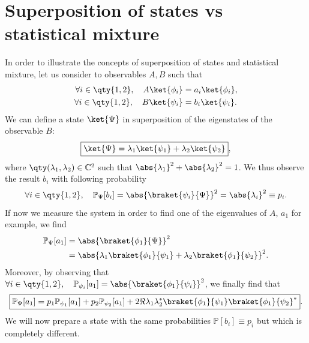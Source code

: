 \appendix
\setlength{\parskip}{2mm}\setlength{\parindent}{6mm}
\renewcommand{\thesubsection}{\thesection.\alph{subsection}\char41}
\renewcommand{\theequation}{\thechapter.~\arabic{equation}}
\chapter{Superposition of states vs statistical mixture}\label{ann:statmix}
In order to illustrate the concepts of superposition of states and statistical mixture, let us consider to observables $A,B$ such that
\begin{align*}
    \forall i\in\qty{1,2},\quad A\ket{\phi_i}&=a_i\ket{\phi_i},\\
    \forall i\in\qty{1,2},\quad B\ket{\psi_i}&=b_i\ket{\psi_i}.
\end{align*}
We can define a state $\ket{\Psi}$ in superposition of the eigenstates of the observable $B$:
\begin{equation}
    \boxed{\ket{\Psi} = \lambda_1\ket{\psi_1}+\lambda_2\ket{\psi_2}},
\end{equation}
where $\qty(\lambda_1,\lambda_2)\in\mathbb{C}^2$ such that $\abs{\lambda_1}^2+\abs{\lambda_2}^2=1$. We thus observe the result $b_i$ with following probability
\begin{equation}
    \forall i\in\qty{1,2},\quad\mathbb{P}_\Psi[b_i]=\abs{\braket{\psi_i}{\Psi}}^2=\abs{\lambda_i}^2\equiv p_i.
\end{equation}
If now we measure the system in order to find one of the eigenvalues of $A$, $a_1$ for example, we find
\begin{align}
    \mathbb{P}_\Psi[a_1] &= \abs{\braket{\phi_1}{\Psi}}^2\\
    &= \abs{\lambda_1\braket{\phi_1}{\psi_1}+\lambda_2\braket{\phi_1}{\psi_2}}^2\notag.
\end{align}
Moreover, by observing that $\forall i\in\qty{1,2},\quad\mathbb{P}_{\psi_i}[a_1]=\abs{\braket{\phi_1}{\psi_i}}^2$, we finally find that
\begin{equation}
    \boxed{\mathbb{P}_\Psi[a_1] = p_1\mathbb{P}_{\psi_1}[a_1]+p_2\mathbb{P}_{\psi_2}[a_1] + 2\Re{\lambda_1\lambda_2^*\braket{\phi_1}{\psi_1}\braket{\phi_1}{\psi_2}^*}}.
\end{equation}
We will now prepare a state with the same probabilities $\mathbb{P}[b_i]\equiv p_i$ but which is completely different.


